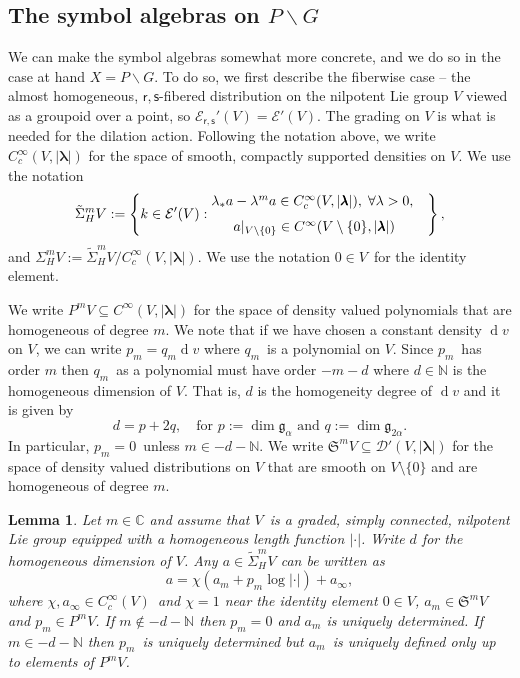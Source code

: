 \documentclass[a4paper,reqno]{amsart}
\numberwithin{equation}{section}
\def\dim{\operatorname{dim}}
\def\rd{\operatorname{d}\!}
\def\C{\mathbb{C}}
\def\N{\mathbb{N}}
\newtheorem{lemma}[thm]{Lemma}
\theoremstyle{definition}
\theoremstyle{remark}
\begin{document}
\subsection{The symbol algebras on $P\backslash G$}
\label{symbollknlknad}
We can make the symbol algebras somewhat more concrete, and we do so in the case at hand $X=P\backslash G$. To do so, we first describe the fiberwise case -- the almost homogeneous, $\mathsf{r},\mathsf{s}$-fibered distribution on the nilpotent Lie group $V$ viewed as a groupoid over a point, so $\mathcal{E}_{\mathsf{r},\mathsf{s}}'(V)=\mathcal{E}'(V)$. The grading on $V$ is what is needed for the dilation action. Following the notation above, we write $C^\infty_c(V,|\pmb{\lambda}|)$ for the space of smooth, compactly supported densities on $V$. We use the notation 
$$\tilde{\Sigma}_H^mV:=\left\{k\in \mathcal{E}'(V): \begin{matrix}\lambda_*a-\lambda^ma\in C^\infty_c(V,|\pmb{\lambda}|), \; \forall \lambda>0,\\ \vspace{-2mm}&\\ 
 \; a|_{V\setminus \{0\}}\in C^\infty(V\setminus \{0\},|\pmb{\lambda}|)\end{matrix}\right\},$$
and $\Sigma_H^mV:=\tilde{\Sigma}_H^mV/C^\infty_c(V,|\pmb{\lambda}|)$. We use the notation $0\in V$ for the identity element. 

We write $P^mV\subseteq C^\infty(V,|\pmb{\lambda}|)$ for the space of density valued polynomials that are homogeneous of degree $m$. We note that if we have chosen a constant density $\rd v$ on $V$, we can write $p_m=q_m\rd v$ where $q_m$ is a polynomial on $V$. Since $p_m$ has order $m$ then $q_m$ as a polynomial must have order $-m-d$ where $d\in \N$ is the homogeneous dimension of $V$. That is, $d$ is the homogeneity degree of $\rd v$ and it is given by 
$$d=p+2q, \quad\mbox{for $p:=\dim\mathfrak{g}_\alpha$ and $q:=\dim\mathfrak{g}_{2\alpha}$.}$$ 
In particular, $p_m=0$ unless $m\in -d-\N$. We write $\mathfrak{S}^mV\subseteq \mathcal{D}'(V,|\pmb{\lambda}|)$ for the space of density valued distributions on $V$ that are smooth on $V\setminus\{0\}$ and are homogeneous of degree $m$.

\begin{lemma}
\label{adanlkn}
Let $m\in \C$ and assume that $V$ is a graded, simply connected, nilpotent Lie group equipped with a homogeneous length function $|\cdot|$. Write $d$ for the homogeneous dimension of $V$. Any $a\in \tilde{\Sigma}_H^mV$ can be written as 
$$a=\chi(a_m+p_m\log|\cdot|)+a_\infty,$$
where $\chi,a_\infty\in C^\infty_c(V)$ and $\chi=1$ near the identity element $0\in V$, $a_m\in \mathfrak{S}^mV$ and $p_m\in P^mV$. If $m\notin -d-\N$ then $p_m=0$ and $a_m$ is uniquely determined. If $m\in -d-\N$ then $p_m$ is uniquely determined but $a_m$ is uniquely defined only up to elements of $P^mV$.
 \end{lemma}
\end{document}
